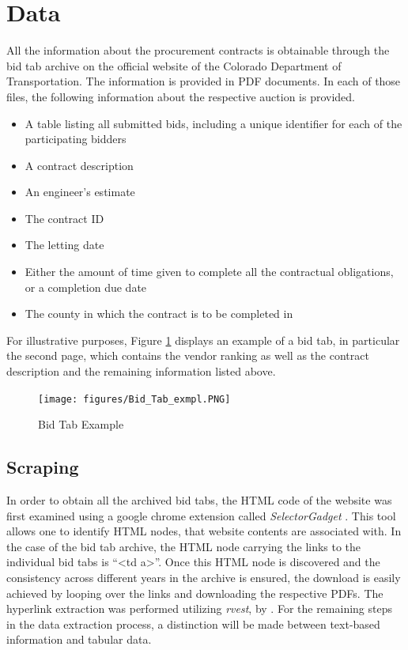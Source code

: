 \documentclass[a4paper,12pt, headsepline]{scrartcl}
\numberwithin{equation}{section}
\begin{document}
\section{Data}\label{sec:data}

All the information about the procurement contracts is obtainable through the bid tab archive on the official website of the Colorado Department of Transportation. The information is provided in PDF documents. In each of those files, the following information about the respective auction is provided.

\begin{itemize}
	\item A table listing all submitted bids, including a unique identifier for each of the participating bidders
	\item A contract description
	\item An engineer's estimate
	\item The contract ID
	\item The letting date
	\item Either the amount of time given to complete all the contractual obligations, or a completion due date
	\item The county in which the contract is to be completed in 
\end{itemize}

For illustrative purposes, Figure \ref{fig:bidtab} displays an example of a bid tab, in particular the second page, which contains the vendor ranking as well as the contract description and the remaining information listed above.

\begin{figure}[H]
	\texttt{[image: figures/Bid\_Tab\_exmpl.PNG]}
	\caption{Bid Tab Example}\label{fig:bidtab}
\end{figure}

\subsection{Scraping}\label{subsec:scrap}
In order to obtain all the archived bid tabs, the HTML code of the website was first examined using a google chrome extension called \textit{SelectorGadget} \citep{selector}. This tool allows one to identify HTML nodes, that website contents are associated with. In the case of the bid tab archive, the HTML node carrying the links to the individual bid tabs is \enquote{<td a>}. Once this HTML node is discovered and the consistency across different years in the archive is ensured, the download is easily achieved by looping over the links and downloading the respective PDFs. The hyperlink extraction was performed utilizing \textit{rvest}, by \citet{rvest}. For the remaining steps in the data extraction process, a distinction will be made between text-based information and tabular data.
\end{document}
